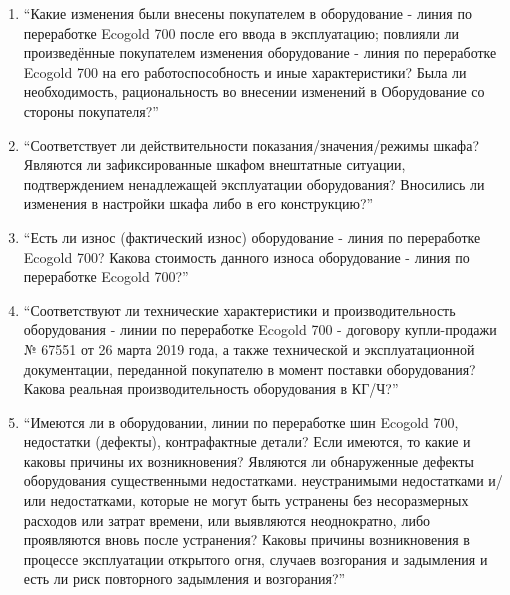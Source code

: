 \begin{enumerate}
	
	\item \enquote{Какие изменения были внесены покупателем в оборудование - линия по переработке Ecogold 700 после его ввода в эксплуатацию; повлияли ли произведённые покупателем изменения оборудование - линия по переработке Ecogold 700 на его работоспособность и иные характеристики? Была ли необходимость, рациональность во внесении изменений в Оборудование со стороны покупателя?}
	
	\item \enquote{Соответствует ли действительности показания/значения/режимы шкафа? Являются ли зафиксированные шкафом внештатные ситуации, подтверждением ненадлежащей эксплуатации оборудования? Вносились ли изменения в настройки шкафа либо в его конструкцию?}
	
	\item \enquote{Есть ли износ (фактический износ) оборудование - линия по переработке Ecogold 700? Какова стоимость данного износа оборудование - линия по переработке Ecogold 700?}
	
	\item \enquote{Соответствуют ли технические характеристики и производительность оборудования - линии по переработке Ecogold 700 - договору купли-продажи № 67551 от 26 марта 2019 года, а также технической и эксплуатационной документации, переданной покупателю в момент поставки оборудования? Какова реальная производительность оборудования в КГ/Ч?}
	
	\item \enquote{Имеются ли в оборудовании, линии по переработке шин Ecogold 700, недостатки (дефекты), контрафактные детали? Если имеются, то какие и каковы причины  их возникновения? Являются ли обнаруженные дефекты оборудования существенными недостатками. неустранимыми недостатками и/или недостатками, которые не могут быть устранены без несоразмерных расходов или затрат времени, или выявляются неоднократно, либо проявляются вновь после устранения? Каковы причины возникновения в процессе эксплуатации открытого огня, случаев возгорания и задымления и есть ли риск повторного задымления и возгорания?}
	

\end{enumerate}
